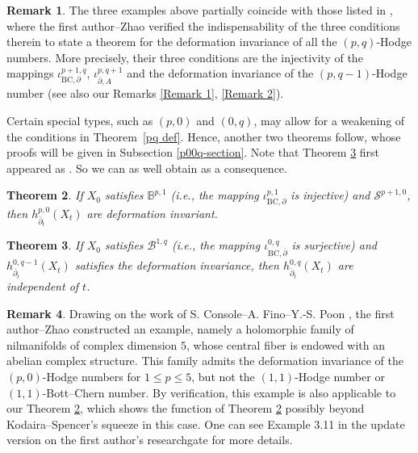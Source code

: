 \documentclass[12pt]{amsart}
\numberwithin{equation}{section}
\newtheorem{theorem} {Theorem} [section]
\theoremstyle{definition}
\theoremstyle{definition}
\theoremstyle{definition}
\newtheorem{remark}  [theorem]     {Remark}
\renewcommand{\1}{\mathsf{1}}
\newcommand{\db}{\overline{\partial}}
\renewcommand{\>}{\rightarrow}
\newcommand{\p}{\partial}
\def\p{\partial}
\theoremstyle{plain} %
\theoremstyle{plain} %
\theoremstyle{plain} %
\begin{document}
	\begin{remark}\label{example remark}
		The three examples above partially coincide with those listed in \cite[Examples 3.2, 3.3, and 3.4]{RZ18}, where  the first author--Zhao  verified the indispensability of the three conditions therein to state a theorem  for the deformation invariance
		of all the $(p,q)$-Hodge numbers. More precisely, their three conditions are the injectivity of the mappings $\iota^{p+1,q}_{\mathrm {BC},\p}$, $\iota^{p,q+1}_{\db,A}$ and
		the deformation invariance of the $(p,q-1)$-Hodge number (see also our Remarks \ref{Remark 1}, \ref{Remark 2}).
	\end{remark}
	Certain special types, such as $(p,0)$ and $(0,q)$, may allow for a weakening of the conditions in Theorem~\ref{pq def}. 
	Hence, another two theorems follow, whose proofs will be given in Subsection \ref{p00q-section}. Note  that Theorem \ref{inv-0q} first appeared as \cite[Theorem 3.7]{RZ18}. So we can as well obtain \cite[Remark 3.8, Corollary 3.9]{RZ18}  as a consequence.
	\begin{theorem}\label{inv-p0}
		If $X_0$ satisfies $\mathbb{B}^{p,1}$ (i.e., the mapping $\iota_{\mathrm {BC},\p}^{p,1}$ is injective) and $\mathcal{S}^{p+1,0}$, then $h^{p,0}_{\db_t}(X_t)$ are deformation invariant.
	\end{theorem}
	
	\begin{theorem}\label{inv-0q}
		If $X_0$ satisfies $\mathcal {B}^{1,q}$ (i.e., the mapping $\iota^{0,q}_{\mathrm {BC},\db}$ is surjective)
		and $h^{0,q-1}_{\db_t}(X_t)$  satisfies the deformation invariance, then
		$h^{0,q}_{\db_t}(X_t)$ are independent of $t$.
	\end{theorem}
	
	\begin{remark}\label{researchgate}
		Drawing on the work of S. Console--A. Fino--Y.-S. Poon \cite{CFP16}, the first author--Zhao constructed an example, namely a holomorphic family of nilmanifolds of complex dimension $5$,
		whose central fiber is endowed with an abelian complex structure.
		This family admits the deformation invariance of the $(p,0)$-Hodge numbers for $1 \leq p \leq 5$,
		but not the $(1,1)$-Hodge number or $(1,1)$-Bott--Chern number. By verification, this example is also applicable to our Theorem \ref{inv-p0}, which shows the function of Theorem \ref{inv-p0} possibly beyond Kodaira--Spencer's squeeze \cite[Theorem 13]{KS60} in this case. One can see  Example 3.11  in the update version on the first author's researchgate \cite{RZ} for more details.
	\end{remark}
	
\end{document}
